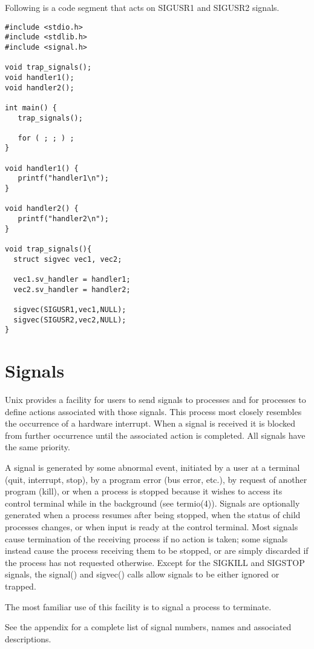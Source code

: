 Following is a code segment that acts on SIGUSR1 and SIGUSR2 signals.

\begin{verbatim}
#include <stdio.h>
#include <stdlib.h>
#include <signal.h>

void trap_signals();
void handler1();
void handler2();

int main() {
   trap_signals();

   for ( ; ; ) ;
}

void handler1() {
   printf("handler1\n");
}

void handler2() {
   printf("handler2\n");
}

void trap_signals(){
  struct sigvec vec1, vec2;

  vec1.sv_handler = handler1;
  vec2.sv_handler = handler2;

  sigvec(SIGUSR1,vec1,NULL);
  sigvec(SIGUSR2,vec2,NULL);
}
\end{verbatim}

\chapter{Signals}
Unix provides a facility for users to send signals to processes and for processes to define actions associated with those signals.
This process most closely resembles the occurrence of a hardware interrupt.
When a signal is received it is blocked from further occurrence until the associated action is completed.
All signals have the same priority.

A signal is generated by some abnormal event, initiated by a user at a terminal (quit, interrupt, stop), by a program error (bus error, etc.), by request of another  program (kill), or when a process is stopped because it wishes to access its control
  terminal while in the background (see termio(4)).
Signals are optionally generated when a process resumes after being stopped, when the status of child processes changes, or when input is ready at the control terminal.
Most signals cause termination of the receiving process if no action is taken; some signals instead cause the process receiving them to be stopped, or are simply discarded if the process has not requested otherwise.
Except for the SIGKILL and SIGSTOP signals, the signal() and sigvec() calls allow signals to be either ignored or trapped.

The most familiar use of this facility is to signal a process to terminate.

See the appendix for a complete list of signal numbers, names and associated descriptions.


